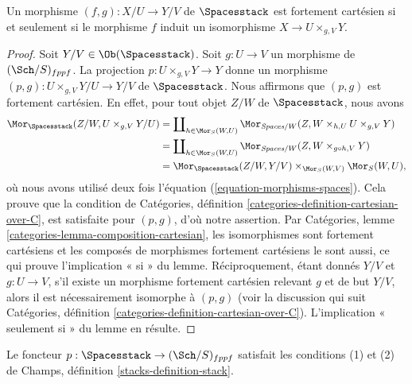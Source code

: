 \begin{lemma}
\label{lemma-spaces-strongly-cartesian}
Un morphisme $(f, g) : X/U \to Y/V$
de $\Spacesstack$ est fortement cartésien si et seulement si le
morphisme $f$ induit un isomorphisme $X \to U \times_{g, V} Y$.
\end{lemma}

\begin{proof}
Soit $Y/V \in \Ob(\Spacesstack)$.
Soit $g : U \to V$ un morphisme de $(\Sch/S)_{fppf}$.
La projection $p : U \times_{g, V} Y \to Y$
donne un morphisme
$(p, g) : U \times_{g, V} Y/U \to Y/V$ de $\Spacesstack$.
Nous affirmons que $(p, g)$ est fortement cartésien.
En effet, pour tout objet $Z/W$ de $\Spacesstack$, nous avons
\begin{align*}
\Mor_{\Spacesstack}(Z/W, U \times_{g, V} Y/U)
& =
\coprod\nolimits_{h \in \Mor_S(W, U)}
\Mor_{\textit{Spaces}/W}(Z, W \times_{h, U} U \times_{g, V} Y) \\
& =
\coprod\nolimits_{h \in \Mor_S(W, U)}
\Mor_{\textit{Spaces}/W}(Z, W \times_{g \circ h, V} Y) \\
& =
\Mor_{\Spacesstack}(Z/W, Y/V)
\times_{\Mor_S(W, V)} \Mor_S(W, U),
\end{align*}
où nous avons utilisé deux fois l'équation (\ref{equation-morphisms-spaces}).
Cela prouve que la condition de
Catégories, définition \ref{categories-definition-cartesian-over-C},
est satisfaite pour $(p, g)$, d'où notre assertion. Par
Catégories, lemme \ref{categories-lemma-composition-cartesian},
les isomorphismes sont fortement cartésiens et
les composés de morphismes fortement cartésiens le sont aussi,
ce qui prouve l'implication « si » du lemme. Réciproquement,
étant donnés $Y/V$ et $g : U \to V$, s'il existe un
morphisme fortement cartésien relevant $g$ et de but $Y/V$,
alors il est nécessairement isomorphe à $(p, g)$ (voir la discussion qui suit
Catégories, définition \ref{categories-definition-cartesian-over-C}).
L'implication « seulement si » du lemme en résulte.
\end{proof}

\begin{lemma}
\label{lemma-pre-stack-of-spaces}
Le foncteur $p : \Spacesstack \to (\Sch/S)_{fppf}$
satisfait les conditions (1) et (2) de
Champs, définition \ref{stacks-definition-stack}.
\end{lemma}

